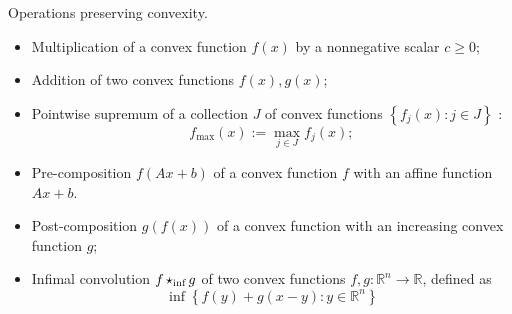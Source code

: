 \begin{theorem}[L4.4]{Operations preserving convexity.}
    \begin{itemize}[leftmargin=*]
        \item Multiplication of a convex function $f(x)$ by a nonnegative scalar $c \geq 0$;
        \item Addition of two convex functions $f(x), g(x)$;
        \item Pointwise supremum of a collection $J$ of convex functions $\left\{f_j(x): j \in J\right\}$ :
        \vspace{-4pt}\\
        $$
        f_{\max }(x):=\max _{j \in J} f_j(x) ;
        $$
        \vspace{-10pt}
        \item Pre-composition $f(A x+b)$ of a convex function $f$ with an affine function $A x+b$.
        \item Post-composition $g(f(x))$ of a convex function with an increasing convex function $g$;
        \item Infimal convolution $f \operatorname{\mathbin{\star_{\text{inf}}}} g$ of two convex functions $f, g: \mathbb{R}^n \rightarrow \mathbb{R}$, defined as
        \vspace{-4pt}\\
        $$
        \inf \left\{f(y)+g(x-y): y \in \mathbb{R}^n\right\}
        $$
        \vspace{-4pt}
    \end{itemize}

\end{theorem}

